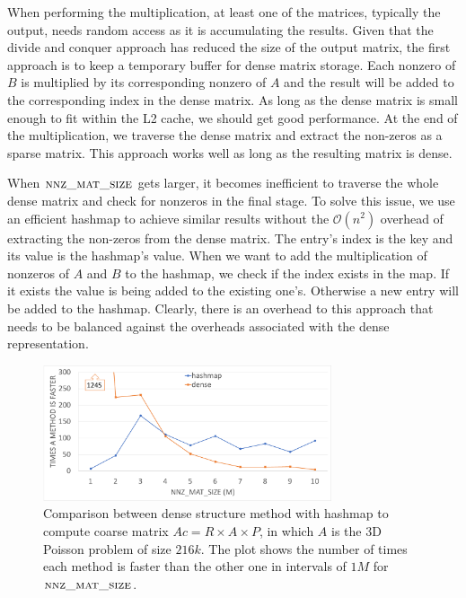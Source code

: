 When performing the multiplication, at least one of the matrices, typically the output, needs random access as it is accumulating the results. Given that the divide and conquer approach has reduced the size of the output matrix, the first approach is to keep a temporary buffer for dense matrix storage. Each nonzero of $B$ is multiplied by its corresponding nonzero of $A$ and the result will be added to the corresponding index in the dense matrix. As long as the dense matrix is small enough to fit within the L2 cache, we should get good performance. At the end of the multiplication, we traverse the dense matrix and extract the non-zeros as a sparse matrix. This approach works well as long as the resulting matrix is dense. 

When $\textsc{nnz\_mat\_size}$ gets larger, it becomes inefficient to traverse the whole dense matrix and check for nonzeros in the final stage. To solve this issue, we use an efficient hashmap to achieve similar results without the $\mathcal{O}(n^2)$ overhead of extracting the non-zeros from the dense matrix. The entry's index is the key and its value is the hashmap's value. When we want to add the multiplication of nonzeros of $A$ and $B$ to the hashmap, we check if the index exists in the map. If it exists the value is being added to the existing one's. Otherwise a new entry will be added to the hashmap. Clearly, there is an overhead to this approach that needs to be balanced against the overheads associated with the dense representation. 

\begin{figure}[tbh]
 \centering
 \includegraphics[width=8.5cm,height=4cm]{./figures/lap60_range.pdf}
 \caption{Comparison between dense structure method with hashmap to compute coarse matrix $Ac = R \times A \times P$, in which $A$ is the 3D Poisson problem of size $216k$. The plot shows the number of times each method is faster than the other one in intervals of $1M$ for $\textsc{nnz\_mat\_size}$.}
 \label{fig:lap60}
\end{figure}

